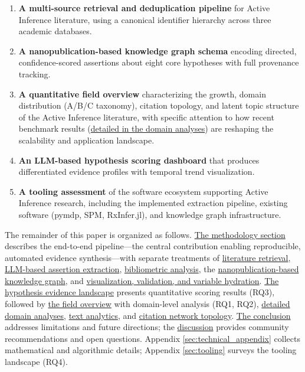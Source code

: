 \documentclass[
  english,
]{article}
\begin{document}
\begin{enumerate}
\def\labelenumi{\arabic{enumi}.}
\item
  \textbf{A multi-source retrieval and deduplication pipeline} for
  Active Inference literature, using a canonical identifier hierarchy
  across three academic databases.
\item
  \textbf{A nanopublication-based knowledge graph schema} encoding
  directed, confidence-scored assertions about eight core hypotheses
  with full provenance tracking.
\item
  \textbf{A quantitative field overview} characterizing the growth,
  domain distribution (A/B/C taxonomy), citation topology, and latent
  topic structure of the Active Inference literature, with specific
  attention to how recent benchmark results
  (\hyperref[sec:subfield_analyses]{detailed in the domain analyses})
  are reshaping the scalability and application landscape.
\item
  \textbf{An LLM-based hypothesis scoring dashboard} that produces
  differentiated evidence profiles with temporal trend visualization.
\item
  \textbf{A tooling assessment} of the software ecosystem supporting
  Active Inference research, including the implemented extraction
  pipeline, existing software (pymdp, SPM, RxInfer.jl), and knowledge
  graph infrastructure.
\end{enumerate}

The remainder of this paper is organized as follows.
\hyperref[sec:methods]{The methodology section} describes the end-to-end
pipeline---the central contribution enabling reproducible, automated
evidence synthesis---with separate treatments of
\hyperref[sec:methods_retrieval]{literature retrieval},
\hyperref[sec:extraction_pipeline]{LLM-based assertion extraction},
\hyperref[sec:methods_bibliometrics]{bibliometric analysis}, the
\hyperref[sec:methods_kg]{nanopublication-based knowledge graph}, and
\hyperref[sec:methods_viz]{visualization, validation, and variable hydration}.
\hyperref[sec:hypothesis_results]{The hypothesis evidence landscape}
presents quantitative scoring results (RQ3), followed by
\hyperref[sec:field_overview]{the field overview} with domain-level
analysis (RQ1, RQ2),
\hyperref[sec:subfield_analyses]{detailed domain analyses},
\hyperref[sec:text_analytics]{text analytics}, and
\hyperref[sec:citation_network]{citation network topology}.
\hyperref[sec:conclusion]{The conclusion} addresses limitations and
future directions; the \hyperref[sec:discussion]{discussion} provides
community recommendations and open questions. Appendix
\ref{sec:technical_appendix} collects mathematical and algorithmic
details; Appendix \ref{sec:tooling} surveys the tooling landscape (RQ4).
\end{document}
